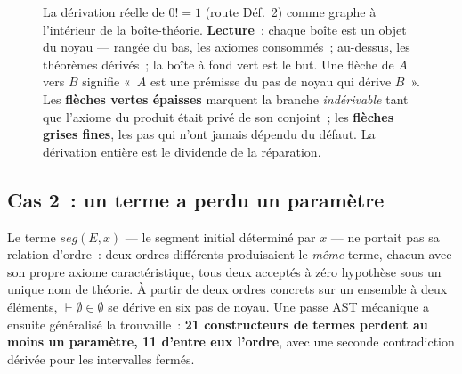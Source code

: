 \documentclass[11pt]{article}
\theoremstyle{remark}\newtheorem{example}{Exemple}
\begin{document}
\begin{figure}[t]\centering
{}
\caption{La dérivation réelle de $0! = 1$ (route Déf.~2) comme graphe à l'intérieur de
la boîte-théorie. \textbf{Lecture}~: chaque boîte est un objet du noyau --- rangée du
bas, les axiomes consommés~; au-dessus, les théorèmes dérivés~; la boîte à fond vert
est le but. Une flèche de $A$ vers $B$ signifie «~$A$ est une prémisse du pas de noyau
qui dérive $B$~». Les \textbf{flèches vertes épaisses} marquent la branche
\emph{indérivable} tant que l'axiome du produit était privé de son conjoint~; les
\textbf{flèches grises fines}, les pas qui n'ont jamais dépendu du défaut. La
dérivation entière est le dividende de la réparation.}
\label{fig:proofgraph}
\end{figure}

\subsection{Cas 2~: un terme a perdu un paramètre}
Le terme $\mathit{seg}(E,x)$ --- le segment initial déterminé par $x$ --- ne portait
pas sa relation d'ordre~: deux ordres différents produisaient le \emph{même} terme,
chacun avec son propre axiome caractéristique, tous deux acceptés à zéro hypothèse sous
un unique nom de théorie. À partir de deux ordres concrets sur un ensemble à deux
éléments, $\vdash \emptyset \in \emptyset$ se dérive en six pas de noyau. Une passe AST
mécanique a ensuite généralisé la trouvaille~: \textbf{21 constructeurs de termes
perdent au moins un paramètre, 11 d'entre eux l'ordre}, avec une seconde contradiction
dérivée pour les intervalles fermés.
\end{document}
